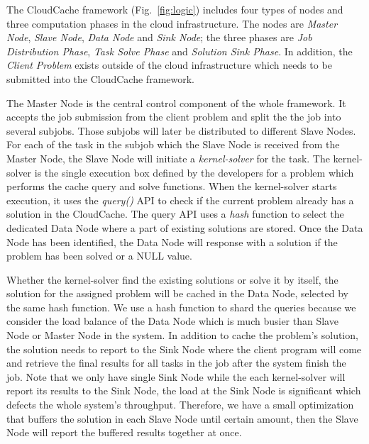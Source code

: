 The CloudCache framework (Fig.~\ref{fig:logic}) includes four types of nodes and three computation phases in the cloud infrastructure. The nodes are \emph{Master Node}, \emph{Slave Node}, \emph{Data Node} and \emph{Sink Node}; the three phases are \emph{Job Distribution Phase}, \emph{Task Solve Phase} and \emph{Solution Sink Phase}. In addition, the \emph{Client Problem} exists outside of the cloud infrastructure which needs to be submitted into the CloudCache framework.

The Master Node is the central control component of the whole framework. It accepts the job submission from the client problem and split the the job into several subjobs. Those subjobs will later be distributed to different Slave Nodes. For each of the task in the subjob which the Slave Node is received from the Master Node, the Slave Node will initiate a \emph{kernel-solver} for the task. The kernel-solver is the single execution box defined by the developers for a problem which performs the cache query and solve functions. When the kernel-solver starts execution, it uses the \emph{query()} API to check if the current problem already has a solution in the CloudCache. The query API uses a \emph{hash} function to select the dedicated Data Node where a part of existing solutions are stored. Once the Data Node has been identified, the Data Node will response with a solution if the problem has been solved or a NULL value.

Whether the kernel-solver find the existing solutions or solve it by itself, the solution for the assigned problem will be cached in the Data Node, selected by the same hash function. We use a hash function to shard the queries because we consider the load balance of the Data Node which is much busier than Slave Node or Master Node in the system. In addition to cache the problem's solution, the solution needs to report to the Sink Node where the client program will come and retrieve the final results for all tasks in the job after the system finish the job. Note that we only have single Sink Node while the each kernel-solver will report its results to the Sink Node, the load at the Sink Node is significant which defects the whole system's throughput. Therefore, we have a small optimization that buffers the solution in each Slave Node until certain amount, then the Slave Node will report the buffered results together at once.

